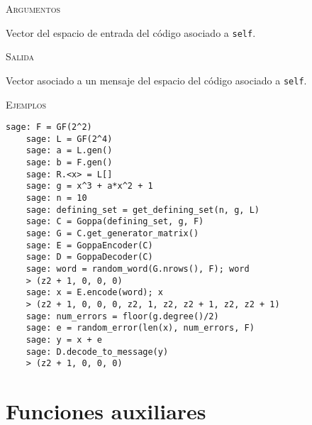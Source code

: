 \begin{description}[leftmargin=1em, font=\normalfont\ttfamily, style=nextline]
\begin{description}[font=\ttfamily, style=nextline]
  \textsc{Argumentos}
  \begin{description}[font=\normalfont\ttfamily]
      \item[word] Vector del espacio de entrada del código asociado a \texttt{self}.
  \end{description}

  \textsc{Salida}
  \begin{description}[font=\normalfont\ttfamily]
      \item[] Vector asociado a un mensaje del espacio del código asociado a \texttt{self}.
  \end{description}

  \textsc{Ejemplos}
  \begin{lstlisting}[gobble=4]
    sage: F = GF(2^2)
    sage: L = GF(2^4)
    sage: a = L.gen()
    sage: b = F.gen()
    sage: R.<x> = L[]
    sage: g = x^3 + a*x^2 + 1
    sage: n = 10
    sage: defining_set = get_defining_set(n, g, L)
    sage: C = Goppa(defining_set, g, F)
    sage: G = C.get_generator_matrix()
    sage: E = GoppaEncoder(C)
    sage: D = GoppaDecoder(C)
    sage: word = random_word(G.nrows(), F); word
    > (z2 + 1, 0, 0, 0)
    sage: x = E.encode(word); x
    > (z2 + 1, 0, 0, 0, z2, 1, z2, z2 + 1, z2, z2 + 1)
    sage: num_errors = floor(g.degree()/2)
    sage: e = random_error(len(x), num_errors, F)
    sage: y = x + e
    sage: D.decode_to_message(y)
    > (z2 + 1, 0, 0, 0)
  \end{lstlisting}
  \end{description}
\end{description}

\section{Funciones auxiliares}

